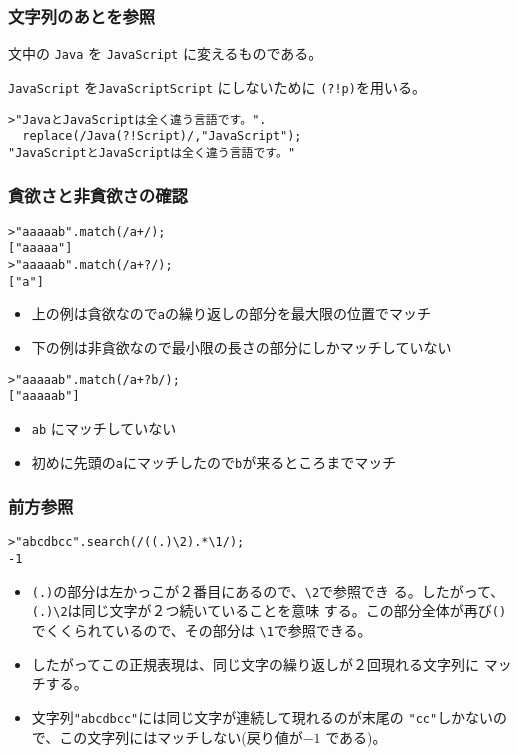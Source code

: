 \begin{frame}[containsverbatim]
 \frametitle{文字列のあとを参照}
文中の \Verb+Java+ を \Verb+JavaScript+ に変えるものである。

\Verb+JavaScript+ を{\Verb+JavaScriptScript+} にしないために
\Verb+(?!p)+を用いる。
\begin{Verbatim}
>"JavaとJavaScriptは全く違う言語です。".
  replace(/Java(?!Script)/,"JavaScript");
"JavaScriptとJavaScriptは全く違う言語です。"
\end{Verbatim}
\end{frame}
\begin{frame}[containsverbatim]
 \frametitle{貪欲さと非貪欲さの確認}
\begin{Verbatim}
>"aaaaab".match(/a+/);
["aaaaa"]
>"aaaaab".match(/a+?/);
["a"]
\end{Verbatim}
\begin{itemize}
 \item 上の例は貪欲なので\Verb+a+の繰り返しの部分を最大限の位置でマッチ
 \item 下の例は非貪欲なので最小限の長さの部分にしかマッチしていない
\end{itemize}
\begin{Verbatim}
>"aaaaab".match(/a+?b/);
["aaaaab"]
\end{Verbatim}
\begin{itemize}
 \item \Verb+ab+ にマッチしていない
 \item 初めに先頭の\Verb+a+にマッチしたので\Verb+b+が来るところまでマッチ
\end{itemize}

\end{frame}
\begin{frame}[containsverbatim]
 \frametitle{前方参照}
\begin{Verbatim}
>"abcdbcc".search(/((.)\2).*\1/);
-1
\end{Verbatim}
\begin{itemize}
 \item \Verb+(.)+の部分は左かっこが２番目にあるので、\Verb+\2+で参照でき
       る。したがって、\Verb+(.)\2+は同じ文字が２つ続いていることを意味
       する。この部分全体が再び\Verb+()+でくくられているので、その部分は
       \Verb+\1+で参照できる。
 \item したがってこの正規表現は、同じ文字の繰り返しが２回現れる文字列に
       マッチする。
 \item 文字列\Verb+"abcdbcc"+には同じ文字が連続して現れるのが末尾の
       \Verb+"cc"+しかないので、この文字列にはマッチしない(戻り値が$-1$
       である)。
\end{itemize}
\end{frame}
